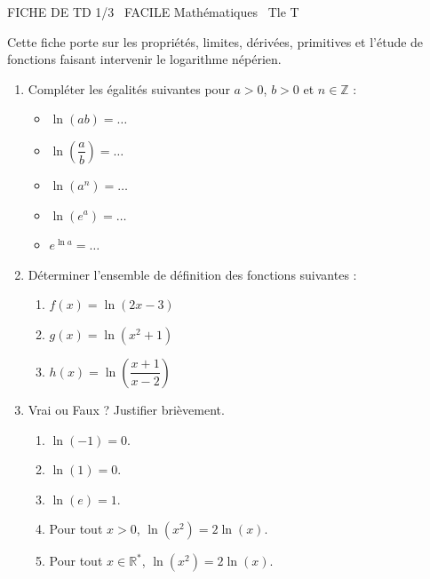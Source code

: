 \documentclass[11pt]{article}
\begin{document}
\begin{tcolorbox}[enhanced,colback=popink,colframe=popink,arc=10pt,boxrule=0pt,left=12pt,right=12pt,top=9pt,bottom=9pt]
{\color{white}\popxbold\small FICHE DE TD 1/3 \textbullet\ FACILE \hfill Mathématiques \textbullet\ Tle T\par}
\end{tcolorbox}
\vspace{4pt}
Cette fiche porte sur les propriétés, limites, dérivées, primitives et l'étude de fonctions faisant intervenir le logarithme népérien.

\begin{exercice}
\begin{enumerate}
    \item Compléter les égalités suivantes pour $a>0$, $b>0$ et $n \in \mathbb{Z}$ :
    \begin{itemize}
        \item $\ln(ab) = \dots$
        \item $\ln\left(\dfrac{a}{b}\right) = \dots$
        \item $\ln(a^n) = \dots$
        \item $\ln(e^a) = \dots$
        \item $e^{\ln a} = \dots$
    \end{itemize}
    \item Déterminer l'ensemble de définition des fonctions suivantes :
    \begin{enumerate}
        \item $f(x) = \ln(2x-3)$
        \item $g(x) = \ln(x^2+1)$
        \item $h(x) = \ln\left(\dfrac{x+1}{x-2}\right)$
    \end{enumerate}
    \item Vrai ou Faux ? Justifier brièvement.
    \begin{enumerate}
        \item $\ln(-1) = 0$.
        \item $\ln(1) = 0$.
        \item $\ln(e) = 1$.
        \item Pour tout $x>0$, $\ln(x^2) = 2\ln(x)$.
        \item Pour tout $x \in \mathbb{R}^*$, $\ln(x^2) = 2\ln(x)$.
    \end{enumerate}
\end{enumerate}
\end{exercice}
\end{document}
